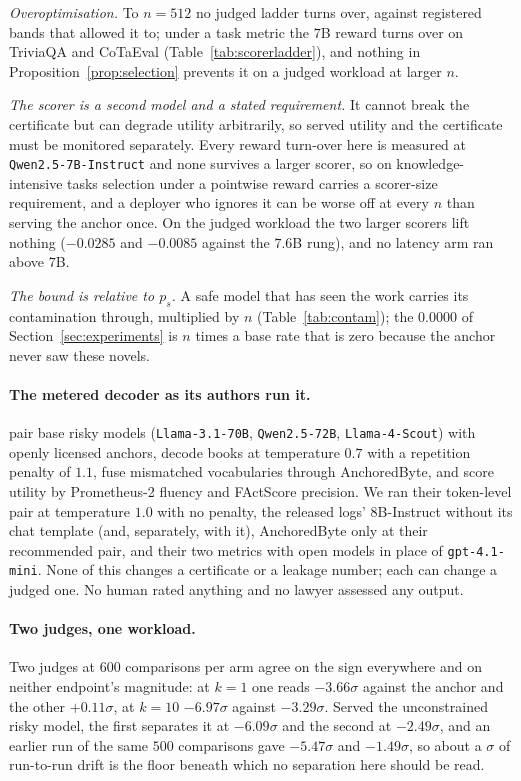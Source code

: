 \emph{Overoptimisation.} To $n=512$ no judged ladder turns over, against registered bands that allowed it
to; under a task metric the $7$B reward turns over on TriviaQA and CoTaEval (Table~\ref{tab:scorerladder}),
and nothing in Proposition~\ref{prop:selection} prevents it on a judged workload at larger $n$.

\emph{The scorer is a second model and a stated requirement.} It cannot break the certificate but can
degrade utility arbitrarily, so served utility and the certificate must be monitored separately. Every
reward turn-over here is measured at \texttt{Qwen2.5-7B-Instruct} and none survives a larger scorer, so on
knowledge-intensive tasks selection under a pointwise reward carries a scorer-size requirement, and a
deployer who ignores it can be worse off at every $n$ than serving the anchor once. On the judged workload
the two larger scorers lift nothing ($-0.0285$ and $-0.0085$ against the $7.6$B rung), and no latency arm
ran above $7$B.

\emph{The bound is relative to $p_s$.} A safe model that has seen the work carries its contamination
through, multiplied by $n$ (Table~\ref{tab:contam}); the $0.0000$ of Section~\ref{sec:experiments} is $n$
times a base rate that is zero because the anchor never saw these novels.

\paragraph{The metered decoder as its authors run it.}
\citet{he2026anchored} pair base risky models (\texttt{Llama-3.1-70B}, \texttt{Qwen2.5-72B},
\texttt{Llama-4-Scout}) with openly licensed anchors, decode books at temperature $0.7$ with a repetition
penalty of $1.1$, fuse mismatched vocabularies through AnchoredByte, and score utility by Prometheus-2
fluency and FActScore precision. We ran their token-level pair at temperature $1.0$ with no penalty, the
released logs' $8$B-Instruct without its chat template (and, separately, with it), AnchoredByte only at
their recommended pair, and their two metrics with open models in place of \texttt{gpt-4.1-mini}. None of
this changes a certificate or a leakage number; each can change a judged one. No human rated anything and no
lawyer assessed any output.

\paragraph{Two judges, one workload.}
Two judges at $600$ comparisons per arm agree on the sign everywhere and on neither endpoint's magnitude:
at $k=1$ one reads $-3.66\sigma$ against the anchor and the other $+0.11\sigma$, at $k=10$ $-6.97\sigma$
against $-3.29\sigma$. Served the unconstrained risky model, the first separates it at $-6.09\sigma$ and the
second at $-2.49\sigma$, and an earlier run of the same $500$ comparisons gave $-5.47\sigma$ and
$-1.49\sigma$, so about a $\sigma$ of run-to-run drift is the floor beneath which no separation here should
be read.

